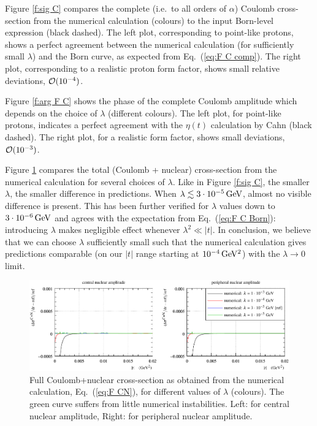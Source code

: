 \documentclass[pdftex,twocolumn,epjc3]{svjour3}
\def\un#1{\,{\rm #1}}
\begin{document}
Figure \ref{f:sig C} compares the complete (i.e.~to all orders of $\alpha$) Coulomb cross-section from the numerical calculation (colours) to the input Born-level expression (black dashed). The left plot, corresponding to point-like protons, shows a perfect agreement between the numerical calculation (for sufficiently small $\lambda$) and the Born curve, as expected from Eq.~(\ref{eq:F C comp}). The right plot, corresponding to a realistic proton form factor, shows small relative deviations, ${\cal O}(10^{-4})$.

Figure \ref{f:arg F C} shows the phase of the complete Coulomb amplitude which depends on the choice of $\lambda$ (different colours). The left plot, for point-like protons, indicates a perfect agreement with the $\eta(t)$ calculation by Cahn (black dashed). The right plot, for a realistic form factor, shows small deviations, ${\cal O}(10^{-3})$.

Figure \ref{f:sig CN} compares the total (Coulomb + nuclear) cross-section from the numerical calculation for several choices of $\lambda$. Like in Figure \ref{f:sig C}, the smaller $\lambda$, the smaller difference in predictions. When $\lambda \lesssim 3\cdot 10^{-5}\un{GeV}$, almost no visible difference is present. This has been further verified for $\lambda$ values down to $3\cdot10^{-6}\un{GeV}$ and agrees with the expectation from Eq.~(\ref{eq:F C Born}): introducing $\lambda$ makes negligible effect whenever $\lambda^2 \ll |t|$. In conclusion, we believe that we can choose $\lambda$ sufficiently small such that the numerical calculation gives predictions comparable (on our $|t|$ range starting at $10^{-4}\un{GeV^2}$) with the $\lambda\to 0$ limit.

\begin{figure}[h]
\begin{center}
\includegraphics{fig/cni_dsdt_cmp_lambda.pdf}
\caption{Full Coulomb+nuclear cross-section as obtained from the numerical calculation, Eq.~(\ref{eq:F CN}), for different values of $\lambda$ (colours). The green curve suffers from little numerical instabilities. Left: for central nuclear amplitude, Right: for peripheral nuclear amplitude.}
\label{f:sig CN}
\end{center}
\end{figure}
\end{document}
